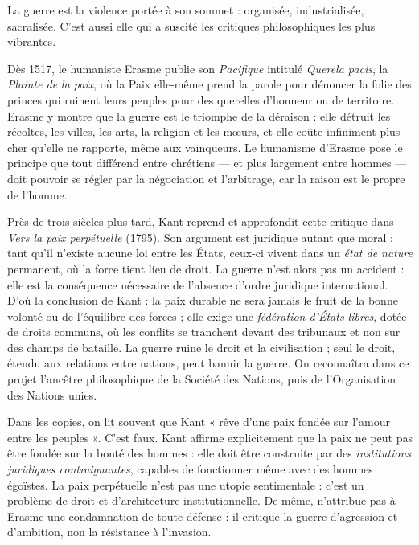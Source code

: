 \documentclass[11pt]{article}
\begin{document}
La guerre est la violence portée à son sommet : organisée, industrialisée, sacralisée. C'est aussi elle qui a suscité les critiques philosophiques les plus vibrantes.

Dès 1517, le humaniste Erasme publie son \emph{Pacifique} intitulé \emph{Querela pacis}, la \emph{Plainte de la paix}, où la Paix elle-même prend la parole pour dénoncer la folie des princes qui ruinent leurs peuples pour des querelles d'honneur ou de territoire. Erasme y montre que la guerre est le triomphe de la déraison : elle détruit les récoltes, les villes, les arts, la religion et les mœurs, et elle coûte infiniment plus cher qu'elle ne rapporte, même aux vainqueurs. Le humanisme d'Erasme pose le principe que tout différend entre chrétiens — et plus largement entre hommes — doit pouvoir se régler par la négociation et l'arbitrage, car la raison est le propre de l'homme.

Près de trois siècles plus tard, Kant reprend et approfondit cette critique dans \emph{Vers la paix perpétuelle} (1795). Son argument est juridique autant que moral : tant qu'il n'existe aucune loi entre les États, ceux-ci vivent dans un \emph{état de nature} permanent, où la force tient lieu de droit. La guerre n'est alors pas un accident : elle est la conséquence nécessaire de l'absence d'ordre juridique international. D'où la conclusion de Kant : la paix durable ne sera jamais le fruit de la bonne volonté ou de l'équilibre des forces ; elle exige une \emph{fédération d'États libres}, dotée de droits communs, où les conflits se tranchent devant des tribunaux et non sur des champs de bataille. La guerre ruine le droit et la civilisation ; seul le droit, étendu aux relations entre nations, peut bannir la guerre. On reconnaîtra dans ce projet l'ancêtre philosophique de la Société des Nations, puis de l'Organisation des Nations unies.

\begin{attention}
Dans les copies, on lit souvent que Kant « rêve d'une paix fondée sur l'amour entre les peuples ». C'est faux. Kant affirme explicitement que la paix ne peut pas être fondée sur la bonté des hommes : elle doit être construite par des \emph{institutions juridiques contraignantes}, capables de fonctionner même avec des hommes égoïstes. La paix perpétuelle n'est pas une utopie sentimentale : c'est un problème de droit et d'architecture institutionnelle. De même, n'attribue pas à Erasme une condamnation de toute défense : il critique la guerre d'agression et d'ambition, non la résistance à l'invasion.
\end{attention}
\end{document}
